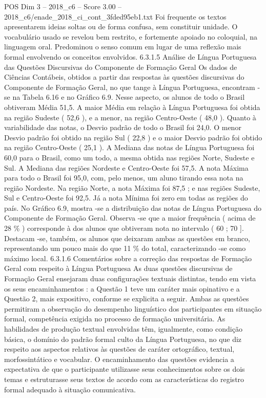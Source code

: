 \begin{textsample}{POS Dim 3 – 2018\_c6 – Score 3.00 – 2018\_c6/enade\_2018\_ci\_cont\_3fded95eb1.txt}
Foi frequente os textos apresentarem ideias soltas ou de forma confusa, sem constituir unidade.
O vocabulário usado se revelou bem restrito, e fortemente apoiado no coloquial, na linguagem oral.
Predominou o senso comum em lugar de uma reflexão mais formal envolvendo os conceitos envolvidos. 6.3.1.5 Análise de Língua Portuguesa das Questões Discursivas do Componente de Formação Geral Os dados de Ciências Contábeis, obtidos a partir das respostas às questões discursivas do Componente de Formação Geral, no que tange à Língua Portuguesa, encontram -se na Tabela 6.16 e no Gráfico 6.9.
Nesse aspecto, os alunos de todo o Brasil obtiveram Média 51,5.
A maior Média em relação à Língua Portuguesa foi obtida na região Sudeste ( 52,6 ), e a menor, na região Centro-Oeste ( 48,0 ).
Quanto à variabilidade das notas, o Desvio padrão de todo o Brasil foi 24,0.
O menor Desvio padrão foi obtido na região Sul ( 22,8 ) e o maior Desvio padrão foi obtido na região Centro-Oeste ( 25,1 ).
A Mediana das notas de Língua Portuguesa foi 60,0 para o Brasil, como um todo, a mesma obtida nas regiões Norte, Sudeste e Sul.
A Mediana das regiões Nordeste e Centro-Oeste foi 57,5.
A nota Máxima para todo o Brasil foi 95,0, com, pelo menos, um aluno tirando essa nota na região Nordeste.
Na região Norte, a nota Máxima foi 87,5 ; e nas regiões Sudeste, Sul e Centro-Oeste foi 92,5.
Já a nota Mínima foi zero em todas as regiões do país.
No Gráfico 6.9, mostra -se a distribuição das notas de Língua Portuguesa do Componente de Formação Geral.
Observa -se que a maior frequência ( acima de 28 \% ) corresponde à dos alunos que obtiveram nota no intervalo ( 60 ; 70 ].
Destacam -se, também, os alunos que deixaram ambas as questões em branco, representando um pouco mais do que 11 \% do total, caracterizando -se como máximo local. 6.3.1.6 Comentários sobre a correção das respostas de Formação Geral com respeito à Língua Portuguesa As duas questões discursivas de Formação Geral ensejaram duas configurações textuais distintas, tendo em vista os seus encaminhamentos : a Questão 1 teve um caráter mais opinativo e a Questão 2, mais expositivo, conforme se explicita a seguir.
Ambas as questões permitiram a observação do desempenho linguístico dos participantes em situação formal, competência exigida no processo de formação universitária.
As habilidades de produção textual envolvidas têm, igualmente, como condição básica, o domínio do padrão formal culto da Língua Portuguesa, no que diz respeito aos aspectos relativos às questões de caráter ortográfico, textual, morfossintático e vocabular.
O encaminhamento das questões evidencia a expectativa de que o participante utilizasse seus conhecimentos sobre os dois temas e estruturasse seus textos de acordo com as características do registro formal adequado à situação comunicativa.

\end{textsample}
